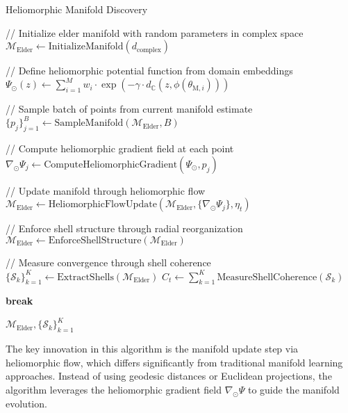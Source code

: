 \begin{algorithm}
\caption{Heliomorphic Manifold Discovery}
\begin{algorithmic}[1]
    \State // Initialize elder manifold with random parameters in complex space
    \State $\mathcal{M}_{\text{Elder}} \gets \text{InitializeManifold}(d_{\text{complex}})$
    
    \State // Define heliomorphic potential function from domain embeddings
    \State $\Psi_{\odot}(z) \gets \sum_{i=1}^M w_i \cdot \exp(-\gamma \cdot d_{\mathbb{C}}(z, \phi(\theta_{\text{M},i})))$
    
        \State // Sample batch of points from current manifold estimate
        \State $\{p_j\}_{j=1}^B \gets \text{SampleManifold}(\mathcal{M}_{\text{Elder}}, B)$
        
        \State // Compute heliomorphic gradient field at each point
            \State $\nabla_{\odot} \Psi_j \gets \text{ComputeHeliomorphicGradient}(\Psi_{\odot}, p_j)$
        \EndFor
        
        \State // Update manifold through heliomorphic flow
        \State $\mathcal{M}_{\text{Elder}} \gets \text{HeliomorphicFlowUpdate}(\mathcal{M}_{\text{Elder}}, \{\nabla_{\odot} \Psi_j\}, \eta_t)$
        
        \State // Enforce shell structure through radial reorganization
        \State $\mathcal{M}_{\text{Elder}} \gets \text{EnforceShellStructure}(\mathcal{M}_{\text{Elder}})$
        
        \State // Measure convergence through shell coherence
        \State $\{\mathcal{S}_k\}_{k=1}^K \gets \text{ExtractShells}(\mathcal{M}_{\text{Elder}})$
        \State $C_t \gets \sum_{k=1}^K \text{MeasureShellCoherence}(\mathcal{S}_k)$
        
            \State \textbf{break}
        \EndIf
    \EndFor
    
    \State \Return $\mathcal{M}_{\text{Elder}}, \{\mathcal{S}_k\}_{k=1}^K$
\EndFunction
\end{algorithmic}
\end{algorithm}

The key innovation in this algorithm is the manifold update step via heliomorphic flow, which differs significantly from traditional manifold learning approaches. Instead of using geodesic distances or Euclidean projections, the algorithm leverages the heliomorphic gradient field $\nabla_{\odot} \Psi$ to guide the manifold evolution.

